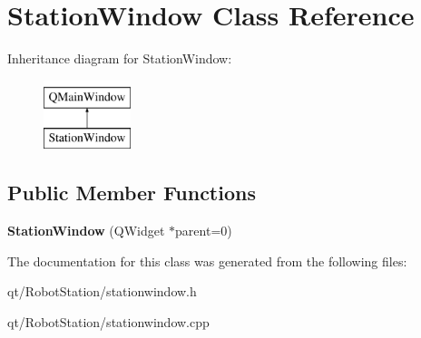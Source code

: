 \hypertarget{classStationWindow}{}\section{Station\+Window Class Reference}
\label{classStationWindow}
Inheritance diagram for Station\+Window\+:\begin{figure}[H]
\begin{center}
\leavevmode
\includegraphics[height=2.000000cm]{classStationWindow}
\end{center}
\end{figure}
\subsection*{Public Member Functions}
\begin{DoxyCompactItemize}
\item 
\hypertarget{classStationWindow_a0458e1bdc1b8feb165180ff7e30dfac4}{}{\bfseries Station\+Window} (Q\+Widget $\ast$parent=0)\label{classStationWindow_a0458e1bdc1b8feb165180ff7e30dfac4}

\end{DoxyCompactItemize}


The documentation for this class was generated from the following files\+:\begin{DoxyCompactItemize}
\item 
qt/\+Robot\+Station/stationwindow.\+h\item 
qt/\+Robot\+Station/stationwindow.\+cpp\end{DoxyCompactItemize}
